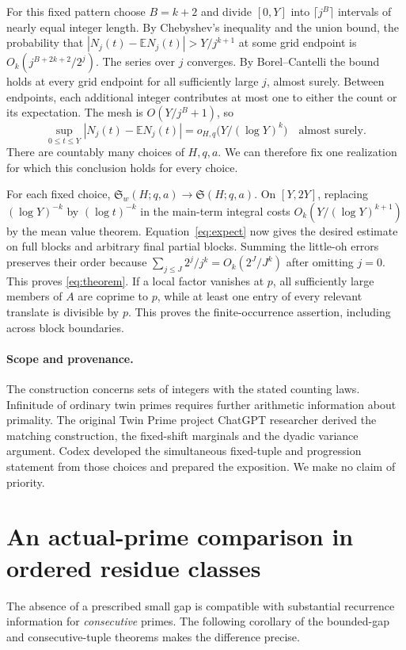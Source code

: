 \documentclass[11pt]{article}
\newcommand{\SSer}{\mathfrak S}
\newcommand{\EE}{\mathbb E}
\begin{document}
For this fixed pattern choose $B=k+2$ and divide $[0,Y]$ into
$\lceil j^B\rceil$ intervals of nearly equal integer length.
By Chebyshev's inequality and the union bound, the probability that
$|N_j(t)-\EE N_j(t)|>Y/j^{k+1}$ at some grid endpoint is
$O_k(j^{B+2k+2}/2^j)$. The series over $j$ converges. By
Borel--Cantelli the bound holds at every grid endpoint for all
sufficiently large $j$, almost surely. Between endpoints, each
additional integer contributes at most one to either the count or
its expectation. The mesh is $O(Y/j^B+1)$, so
\[
 \sup_{0\le t\le Y}|N_j(t)-\EE N_j(t)|
       =o_{H,q}\bigl(Y/(\log Y)^k\bigr)\quad\text{almost surely}.
\]
There are countably many choices of $H,q,a$. We can therefore fix
one realization for which this conclusion holds for every choice.

For each fixed choice, $\SSer_w(H;q,a)\to\SSer(H;q,a)$. On $[Y,2Y]$,
replacing $(\log Y)^{-k}$ by $(\log t)^{-k}$ in the main-term
integral costs $O_k(Y/(\log Y)^{k+1})$ by the mean value theorem.
Equation~\eqref{eq:expect} now gives the desired estimate on full
blocks and arbitrary final partial blocks. Summing the little-oh
errors preserves their order because
$\sum_{j\le J}2^j/j^k=O_k(2^J/J^k)$ after omitting $j=0$.
This proves \eqref{eq:theorem}. If a local factor vanishes at $p$,
all sufficiently large members of $A$ are coprime to $p$, while at
least one entry of every relevant translate is divisible by $p$.
This proves the finite-occurrence assertion, including across block
boundaries.

\paragraph{Scope and provenance.}
The construction concerns sets of integers with the stated counting
laws. Infinitude of ordinary twin primes requires further arithmetic
information about primality. The original Twin Prime project ChatGPT
researcher derived the matching construction, the fixed-shift
marginals and the dyadic variance argument. Codex developed the
simultaneous fixed-tuple and progression statement from those choices
and prepared the exposition. We make no claim of priority.


\section{An actual-prime comparison in ordered residue classes}
The absence of a prescribed small gap is compatible with substantial
recurrence information for \emph{consecutive} primes. The following
corollary of the bounded-gap and consecutive-tuple theorems makes the
difference precise.
\end{document}
